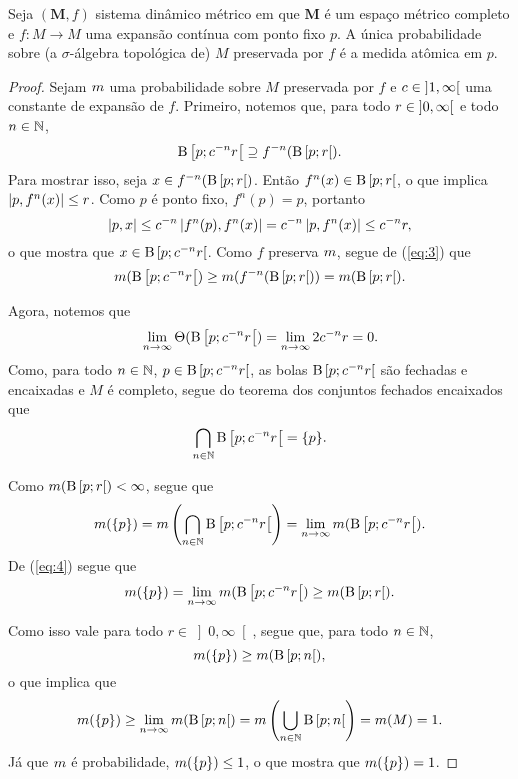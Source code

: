 \begin{proposition}
Seja $(\bm M,f)$ sistema dinâmico métrico em que $\bm M$ é um espaço métrico completo e $f\colon M \to M$ uma expansão contínua com ponto fixo $p$. A única probabilidade sobre (a $\sigma$-álgebra topológica de) $M$ preservada por $f$ é a medida atômica em $p$.
\end{proposition}
\begin{proof}
Sejam $m$ uma probabilidade sobre $M$ preservada por $f$ e $c \in \left]{1},{\infty}\right[$ uma constante de expansão de $f$. Primeiro, notemos que, para todo $r \in \left]{0},{\infty}\right[$ e todo $n \in \mathbb{N}$,
	\begin{equation}\label{eq:3}
	\mathrm{B}\left[{p};{c^{-n} r}\right[ \supseteq f^{-n}(\mathrm{B}\left[{p};{r}\right[).
	\end{equation}
Para mostrar isso, seja $x \in f^{-n}(\mathrm{B}\left[{p};{r}\right[)$. Então $f^n(x) \in \mathrm{B}\left[{p};{r}\right[$, o que implica $\left\vert{p},{f^n(x)}\right\vert \leq r$. Como $p$ é ponto fixo, $f^n(p)=p$, portanto
	\begin{equation*}
	\left\vert{p},{x}\right\vert \leq c^{-n} \left\vert{f^n(p)},{f^n(x)}\right\vert = c^{-n} \left\vert{p},{f^n(x)}\right\vert \leq c^{-n} r,
	\end{equation*}
o que mostra que $x \in \mathrm{B}\left[{p};{c^{-n} r}\right[$. Como $f$ preserva $m$, segue de (\ref{eq:3}) que
	\begin{equation}\label{eq:4}
	m(\mathrm{B}\left[{p};{c^{-n} r}\right[) \geq m(f^{-n}(\mathrm{B}\left[{p};{r}\right[)) = m(\mathrm{B}\left[{p};{r}\right[).
	\end{equation}

Agora, notemos que
	\begin{equation*}
	\lim_{n \to \infty} \Theta(\mathrm{B}\left[{p};{c^{-n} r}\right[) = \lim_{n \to \infty} 2c^{-n} r = 0.
	\end{equation*}
Como, para todo $n \in \mathbb{N}$, $p \in \mathrm{B}\left[{p};{c^{-n} r}\right[$, as bolas $\mathrm{B}\left[{p};{c^{-n} r}\right[$ são fechadas e encaixadas e $M$ é completo, segue do teorema dos conjuntos fechados encaixados que
	\begin{equation*}
	\bigcap_{n \in \mathbb{N}} \mathrm{B}\left[{p};{c^{-n} r}\right[ = \{p\}.
	\end{equation*}

Como $m(\mathrm{B}\left[{p};{r}\right[)<\infty$, segue que
	\begin{equation*}
	m(\{p\}) = m\left(\bigcap_{n \in \mathbb{N}} \mathrm{B}\left[{p};{c^{-n} r}\right[\right) = \lim_{n \to \infty} m(\mathrm{B}\left[{p};{c^{-n} r}\right[).
	\end{equation*}
De (\ref{eq:4}) segue que
	\begin{equation*}
	m(\{p\}) = \lim_{n \to \infty} m(\mathrm{B}\left[{p};{c^{-n} r}\right[) \geq m(\mathrm{B}\left[{p};{r}\right[).
	\end{equation*}

Como isso vale para todo $r \in \left]0,\infty\right[$, segue que, para todo $n \in \mathbb{N}$,
	\begin{equation*}
	m(\{p\}) \geq m(\mathrm{B}\left[{p};{n}\right[),
	\end{equation*}
o que implica que
	\begin{equation*}
	m(\{p\}) \geq \lim_{n \to \infty} m(\mathrm{B}\left[{p};{n}\right[) = m\left( \bigcup_{n \in \mathbb{N}} \mathrm{B}\left[{p};{n}\right[ \right) = m(M) = 1.
	\end{equation*}
Já que $m$ é probabilidade, $m(\{p\}) \leq 1$, o que mostra que $m(\{p\}) = 1$.
\end{proof}
